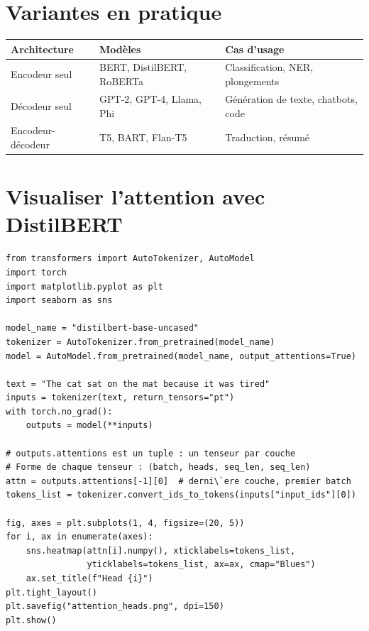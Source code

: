 \section{Variantes en pratique}

\begin{longtable}{p{3.5cm}p{3.5cm}p{5cm}}
\toprule
\textbf{Architecture} & \textbf{Mod\`eles} & \textbf{Cas d'usage} \\
\midrule
Encodeur seul & BERT, DistilBERT, RoBERTa & Classification, NER, plongements \\
D\'ecodeur seul & GPT-2, GPT-4, Llama, Phi & G\'en\'eration de texte, chatbots, code \\
Encodeur-d\'ecodeur & T5, BART, Flan-T5 & Traduction, r\'esum\'e \\
\bottomrule
\end{longtable}

\section{Visualiser l'attention avec DistilBERT}

\begin{verbatim}
from transformers import AutoTokenizer, AutoModel
import torch
import matplotlib.pyplot as plt
import seaborn as sns

model_name = "distilbert-base-uncased"
tokenizer = AutoTokenizer.from_pretrained(model_name)
model = AutoModel.from_pretrained(model_name, output_attentions=True)

text = "The cat sat on the mat because it was tired"
inputs = tokenizer(text, return_tensors="pt")
with torch.no_grad():
    outputs = model(**inputs)

# outputs.attentions est un tuple : un tenseur par couche
# Forme de chaque tenseur : (batch, heads, seq_len, seq_len)
attn = outputs.attentions[-1][0]  # derni\`ere couche, premier batch
tokens_list = tokenizer.convert_ids_to_tokens(inputs["input_ids"][0])

fig, axes = plt.subplots(1, 4, figsize=(20, 5))
for i, ax in enumerate(axes):
    sns.heatmap(attn[i].numpy(), xticklabels=tokens_list,
                yticklabels=tokens_list, ax=ax, cmap="Blues")
    ax.set_title(f"Head {i}")
plt.tight_layout()
plt.savefig("attention_heads.png", dpi=150)
plt.show()
\end{verbatim}

